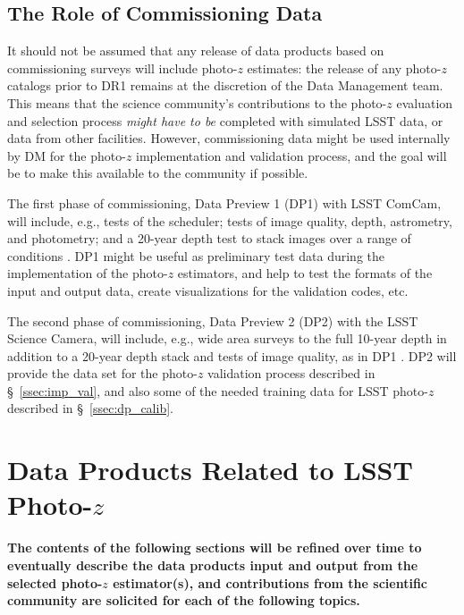 \documentclass[DM,lsstdraft,toc]{lsstdoc}
\begin{document}
\subsection{The Role of Commissioning Data}\label{ssec:imp_commissioning}

It should not be assumed that any release of data products based on commissioning surveys will include photo-$z$ estimates: the release of any photo-$z$ catalogs prior to DR1 remains at the discretion of the Data Management team.
This means that the science community's contributions to the photo-$z$ evaluation and selection process {\it might have to be} completed with simulated LSST data, or data from other facilities.
However, commissioning data might be used internally by DM for the photo-$z$ implementation and validation process, and the goal will be to make this available to the community if possible.

The first phase of commissioning, Data Preview 1 (DP1) with LSST ComCam, will include, e.g., tests of the scheduler; tests of image quality, depth, astrometry, and photometry; and a 20-year depth test to stack images over a range of conditions .
DP1 might be useful as preliminary test data during the implementation of the photo-$z$ estimators, and help to test the formats of the input and output data, create visualizations for the validation codes, etc.

The second phase of commissioning, Data Preview 2 (DP2) with the LSST Science Camera, will include, e.g., wide area surveys to the full 10-year depth in addition to a 20-year depth stack and tests of image quality, as in DP1 .
DP2 will provide the data set for the photo-$z$ validation process described in \S~\ref{ssec:imp_val}, and also some of the needed training data for LSST photo-$z$ described in \S~\ref{ssec:dp_calib}.




\clearpage
\section{Data Products Related to LSST Photo-$z$}\label{sec:dp}

\textbf{The contents of the following sections will be refined over time to eventually describe the data products input and output from the selected photo-$z$ estimator(s), and contributions from the scientific community are solicited for each of the following topics.}
\end{document}
